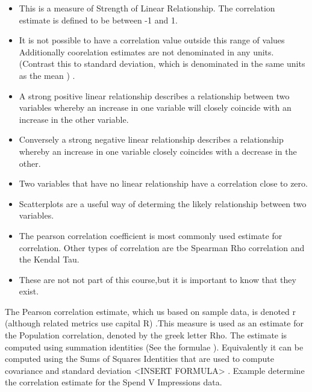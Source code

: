 		\begin{itemize}
			\item This is a measure of Strength of Linear Relationship. 
			The correlation estimate is defined to be between -1 and 1. 
			\item It is not possible to have a correlation value outside this range of values
			Additionally coorelation estimates are not denominated in any units. (Contrast this to standard deviation, which is denominated in the same units as the mean ) .
			\item A strong positive linear relationship describes a relationship between two variables whereby an increase in one variable will closely coincide with an increase in the other variable. 
			\item Conversely a strong negative linear relationship describes a relationship whereby an increase in one variable closely coincides with a decrease in the other. 
		\end{itemize}
\begin{itemize}
			\item  Two variables that have no linear relationship have a correlation close to zero. 
			
			\item Scatterplots are a useful way of determing the likely relationship between two variables. 
			
			\item The pearson correlation coefficient is most commonly used estimate for correlation. Other types of correlation are tbe Spearman Rho correlation and the Kendal Tau. 
			
			\item  These are not not part of this course,but it is important to know that they exist. 
		\end{itemize}
		
		
		
		
		The Pearson correlation estimate, which us based on sample data, is denoted r (although related metrics use capital R) .This measure is used as an estimate for the Population correlation, denoted by the greek letter Rho. 
		The estimate is computed using summation identities (See the formulae ). 
		Equivalently it can be computed using the  Sums of Squares Identities that are used to compute covariance and standard deviation <INSERT FORMULA> .
		Example
		determine the correlation estimate for the Spend V Impressions data.  
		
